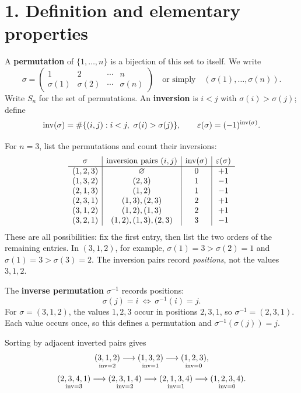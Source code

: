 \section*{1. Definition and elementary properties}

A \textbf{permutation} of
\(\{1,\ldots,n\}\) is a bijection of this set to itself. We write
\[
\sigma=\begin{pmatrix}1&2&\cdots&n\\
                     \sigma(1)&\sigma(2)&\cdots&\sigma(n)\end{pmatrix}
\quad\text{or simply}\quad(\sigma(1),\ldots,\sigma(n)).
\]
Write \(S_n\) for the set of permutations. An \textbf{inversion} is
\(i<j\) with \(\sigma(i)>\sigma(j)\); define
\[
\invcount(\sigma)=\#\{(i,j):i<j,\ \sigma(i)>\sigma(j)\},
\qquad \varepsilon(\sigma)=(-1)^{\invcount(\sigma)}.
\]

For \(n=3\), list the
permutations and count their inversions:
\[
\begin{array}{c|c|c|c}
\sigma&\text{inversion pairs }(i,j)&\operatorname{inv}(\sigma)&\varepsilon(\sigma)\\ \hline
(1,2,3)&\varnothing&0&+1\\
(1,3,2)&(2,3)&1&-1\\
(2,1,3)&(1,2)&1&-1\\
(2,3,1)&(1,3),(2,3)&2&+1\\
(3,1,2)&(1,2),(1,3)&2&+1\\
(3,2,1)&(1,2),(1,3),(2,3)&3&-1
\end{array}
\]
These are all possibilities: fix the first entry, then list the two
orders of the remaining entries. In \((3,1,2)\), for example,
\(\sigma(1)=3>\sigma(2)=1\) and \(\sigma(1)=3>\sigma(3)=2\).
The inversion pairs record \emph{positions}, not the values \(3,1,2\).

The \textbf{inverse permutation} \(\sigma^{-1}\) records positions:
\[
\sigma(j)=i\ \Longleftrightarrow\ \sigma^{-1}(i)=j.
\]
For \(\sigma=(3,1,2)\), the values \(1,2,3\) occur in positions \(2,3,1\),
so \(\sigma^{-1}=(2,3,1)\). Each value occurs once, so this defines a
permutation and \(\sigma^{-1}(\sigma(j))=j\).

Sorting by adjacent inverted pairs gives
\[
\underset{\operatorname{inv}=2}{(3,1,2)}
\longrightarrow\underset{\operatorname{inv}=1}{(1,3,2)}
\longrightarrow\underset{\operatorname{inv}=0}{(1,2,3)},
\]
\[
\underset{\operatorname{inv}=3}{(2,3,4,1)}
\longrightarrow\underset{\operatorname{inv}=2}{(2,3,1,4)}
\longrightarrow\underset{\operatorname{inv}=1}{(2,1,3,4)}
\longrightarrow\underset{\operatorname{inv}=0}{(1,2,3,4)}.
\]


